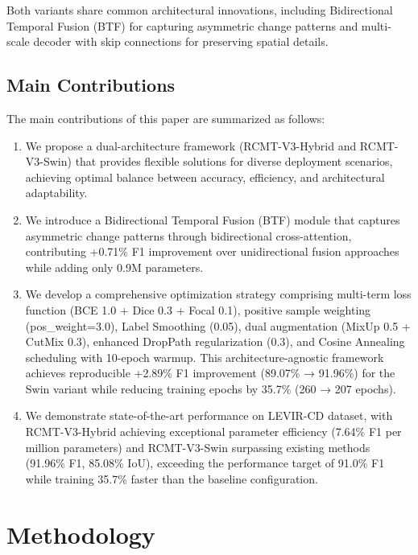 \documentclass[journal]{IEEEtran}
\begin{document}
Both variants share common architectural innovations, including Bidirectional Temporal Fusion (BTF) for capturing asymmetric change patterns and multi-scale decoder with skip connections for preserving spatial details.

\subsection{Main Contributions}

The main contributions of this paper are summarized as follows:

\begin{enumerate}
\item We propose a dual-architecture framework (RCMT-V3-Hybrid and RCMT-V3-Swin) that provides flexible solutions for diverse deployment scenarios, achieving optimal balance between accuracy, efficiency, and architectural adaptability.

\item We introduce a Bidirectional Temporal Fusion (BTF) module that captures asymmetric change patterns through bidirectional cross-attention, contributing +0.71\% F1 improvement over unidirectional fusion approaches while adding only 0.9M parameters.

\item We develop a comprehensive optimization strategy comprising multi-term loss function (BCE 1.0 + Dice 0.3 + Focal 0.1), positive sample weighting (pos\_weight=3.0), Label Smoothing (0.05), dual augmentation (MixUp 0.5 + CutMix 0.3), enhanced DropPath regularization (0.3), and Cosine Annealing scheduling with 10-epoch warmup. This architecture-agnostic framework achieves reproducible +2.89\% F1 improvement (89.07\% → 91.96\%) for the Swin variant while reducing training epochs by 35.7\% (260 → 207 epochs).

\item We demonstrate state-of-the-art performance on LEVIR-CD dataset, with RCMT-V3-Hybrid achieving exceptional parameter efficiency (7.64\% F1 per million parameters) and RCMT-V3-Swin surpassing existing methods (91.96\% F1, 85.08\% IoU), exceeding the performance target of 91.0\% F1 while training 35.7\% faster than the baseline configuration.
\end{enumerate}

\section{Methodology}
\end{document}

